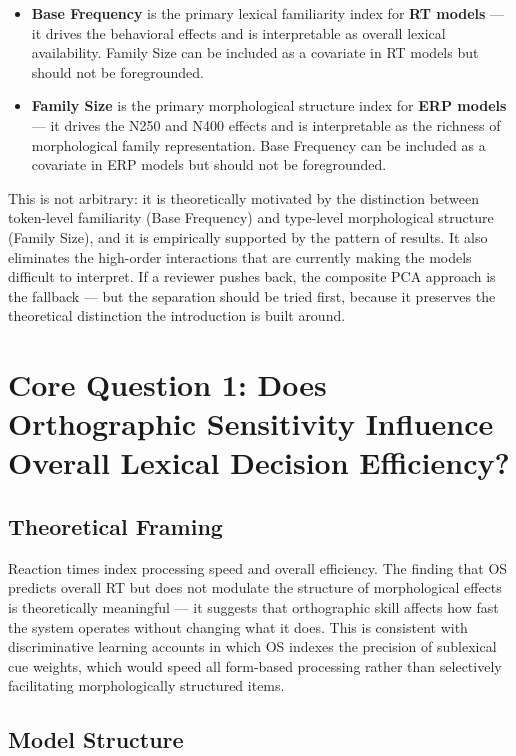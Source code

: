 \documentclass[12pt]{article}
\begin{document}
	\begin{itemize}
		\item \textbf{Base Frequency} is the primary lexical familiarity index for \textbf{RT models} --- it drives the behavioral effects and is interpretable as overall lexical availability. Family Size can be included as a covariate in RT models but should not be foregrounded.
		\item \textbf{Family Size} is the primary morphological structure index for \textbf{ERP models} --- it drives the N250 and N400 effects and is interpretable as the richness of morphological family representation. Base Frequency can be included as a covariate in ERP models but should not be foregrounded.
	\end{itemize}
	
	This is not arbitrary: it is theoretically motivated by the distinction between token-level familiarity (Base Frequency) and type-level morphological structure (Family Size), and it is empirically supported by the pattern of results. It also eliminates the high-order interactions that are currently making the models difficult to interpret. If a reviewer pushes back, the composite PCA approach is the fallback --- but the separation should be tried first, because it preserves the theoretical distinction the introduction is built around.
	
	\section{Core Question 1: Does Orthographic Sensitivity Influence Overall Lexical Decision Efficiency?}
	
	\subsection{Theoretical Framing}
	
	Reaction times index processing speed and overall efficiency. The finding that OS predicts overall RT but does not modulate the structure of morphological effects is theoretically meaningful --- it suggests that orthographic skill affects how fast the system operates without changing what it does. This is consistent with discriminative learning accounts in which OS indexes the precision of sublexical cue weights, which would speed all form-based processing rather than selectively facilitating morphologically structured items.
	
	\subsection{Model Structure}
	
\end{document}
